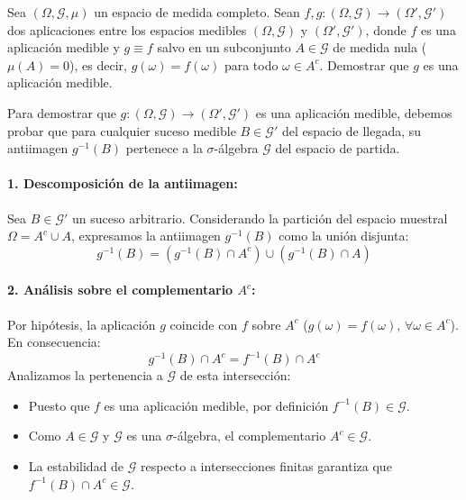 \newpage
\begin{problema}
Sea $(\Omega, \mathcal{G}, \mu)$ un espacio de medida completo. Sean $f, g : (\Omega, \mathcal{G}) \to (\Omega', \mathcal{G}')$ dos aplicaciones entre los espacios medibles $(\Omega, \mathcal{G})$ y $(\Omega', \mathcal{G}')$, donde $f$ es una aplicación medible y $g \equiv f$ salvo en un subconjunto $A \in \mathcal{G}$ de medida nula ($\mu(A) = 0$), es decir, $g(\omega) = f(\omega)$ para todo $\omega \in A^c$. Demostrar que $g$ es una aplicación medible.

\tcblower

Para demostrar que $g : (\Omega, \mathcal{G}) \to (\Omega', \mathcal{G}')$ es una aplicación medible, debemos probar que para cualquier suceso medible $B \in \mathcal{G}'$ del espacio de llegada, su antiimagen $g^{-1}(B)$ pertenece a la $\sigma$-álgebra $\mathcal{G}$ del espacio de partida.

\paragraph{1. Descomposición de la antiimagen:}
Sea $B \in \mathcal{G}'$ un suceso arbitrario. Considerando la partición del espacio muestral $\Omega = A^c \cup A$, expresamos la antiimagen $g^{-1}(B)$ como la unión disjunta:
\[
    g^{-1}(B) = (g^{-1}(B) \cap A^c) \cup (g^{-1}(B) \cap A)
\]

\paragraph{2. Análisis sobre el complementario $A^c$:}
Por hipótesis, la aplicación $g$ coincide con $f$ sobre $A^c$ ($g(\omega) = f(\omega), \, \forall \omega \in A^c$). En consecuencia:
\[
    g^{-1}(B) \cap A^c = f^{-1}(B) \cap A^c
\]
Analizamos la pertenencia a $\mathcal{G}$ de esta intersección:
\begin{itemize}
    \item Puesto que $f$ es una aplicación medible, por definición $f^{-1}(B) \in \mathcal{G}$.
    \item Como $A \in \mathcal{G}$ y $\mathcal{G}$ es una $\sigma$-álgebra, el complementario $A^c \in \mathcal{G}$.
    \item La estabilidad de $\mathcal{G}$ respecto a intersecciones finitas garantiza que $f^{-1}(B) \cap A^c \in \mathcal{G}$.
\end{itemize}


\end{problema}
